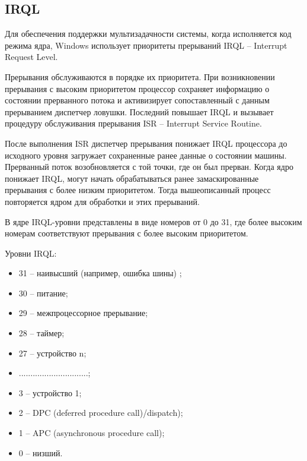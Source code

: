 \clearpage
\subsection*{IRQL}

Для обеспечения поддержки мультизадачности системы, когда исполняется код режима ядра, Windows использует приоритеты прерываний IRQL --  Interrupt Request Level.

Прерывания обслуживаются в порядке их приоритета. При возникновении прерывания с высоким приоритетом процессор сохраняет информацию о состоянии прерванного потока и активизирует сопоставленный с данным прерыванием диспетчер ловушки. Последний повышает IRQL и вызывает
процедуру обслуживания прерывания ISR -- Interrupt Service Routine.

После выполнения ISR диспетчер прерывания понижает IRQL процессора до исходного уровня загружает сохраненные ранее данные о состоянии машины. Прерванный поток возобновляется с той точки, где он был прерван. Когда ядро понижает IRQL, могут начать обрабатываться ранее замаскированные прерывания с более низким приоритетом. Тогда вышеописанный процесс повторяется ядром для обработки и этих прерываний.

В ядре IRQL-уровни представлены в виде номеров от 0 до 31, где более высоким номерам соответствуют прерывания с более высоким приоритетом.

Уровни IRQL:
\begin{itemize}[label*=---]
	\item 31 -- наивысший (например, ошибка шины) ;
	\item 30 -- питание;
	\item 29 -- межпроцессорное прерывание;
	\item 28 -- таймер;
	\item 27 -- устройство n;
	\item ..............................;
	\item 3 -- устройство 1;
	\item 2 -- DPC (deferred procedure call)/dispatch);
	\item 1 -- APC (asynchronous procedure call);
	\item 0 -- низший.
\end{itemize}

